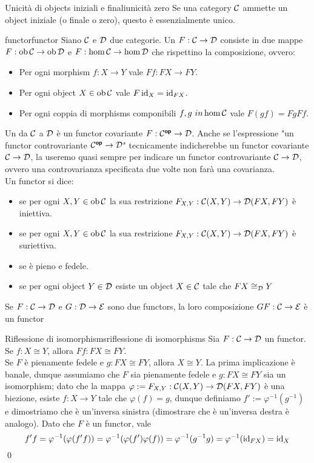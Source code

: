 \documentclass{article}
\renewcommand\C{\mc{C}}
\newcommand\D{\mc{D}}
\begin{document}
\begin{proposition}{Unicità di objects iniziali e finali}{unicità zero}
    Se una category $\C$ ammette un object iniziale (o finale o zero), questo è essenzialmente unico.
\end{proposition}

\begin{definition}{functor}{functor}
    Siano $\C$ e $\D$ due categorie. Un  $F: \C\to\D$ consiste in due mappe $F:\ob\C\to\ob\D$ e $F:\hom\C\to\hom\D$ che rispettino la composizione, ovvero:\begin{itemize}
        \item Per ogni morphism $f :X\to Y$ vale $Ff: FX \to FY$.
        \item Per ogni object $X \in \ob\C$ vale $F\operatorname{id}_X = \operatorname{id}_{FX}$.
        \item Per ogni coppia di morphisms componibili $f,g\ in \hom\C$ vale $F(gf) = FgFf$.
    \end{itemize}
    Un  da $\C$ a $\D$ è un functor covariante $F: \C^\op\to\D$. Anche se l'espressione "un functor controvariante $\C^\op\to\D$" tecnicamente indicherebbe un functor covariante $\C\to\D$, la useremo quasi sempre per indicare un functor controvariante $\C\to\D$, ovvero una controvarianza specificata due volte non farà una covarianza.\\
    Un functor si dice:\begin{itemize}
        \item {} se per ogni $X,Y \in \ob\C$ la sua restrizione $F_{X,Y}:\C(X,Y)\to \D(FX,FY)$ è iniettiva.
        \item {} se per ogni $X,Y \in \ob\C$ la sua restrizione $F_{X,Y}:\C(X,Y)\to \D(FX,FY)$ è suriettiva.
        \item {} se è pieno e fedele.
        \item {} se per ogni object $Y \in \D$ esiste un object $X \in \C$ tale che $FX\cong_\D Y$
    \end{itemize}
    Se $F:\C\to\D$ e $G:\D\to\mc{E}$ sono due functors, la loro composizione $GF : \C\to\mc{E}$ è un functor
\end{definition}

\begin{proposition}{Riflessione di isomorphisms}{riflessione di isomorphisms}
    Sia $F:\C\to\D$ un functor. Se $f:X\cong Y$, allora $Ff:FX\cong FY$.\\
    Se $F$ è pienamente fedele e $g:FX\cong FY$, allora $X\cong Y$.
    \proof 
    La prima implicazione è banale, dunque assumiamo che $F$ sia pienamente fedele e $g:FX\cong FY$ sia un isomorphism; dato che la mappa $\varphi := F_{X,Y} : \C(X,Y) \to \D(FX,FY)$ è una biezione, esiste $f: X\to Y$ tale che $\varphi(f) = g$, dunque definiamo $f' := \varphi^{-1}(g^{-1})$ e dimostriamo che è un'inversa sinistra (dimostrare che è un'inversa destra è analogo). Dato che $F$ è un functor, vale
    \[f'f = \varphi^{-1}(\varphi(f'f) )=\varphi^{-1}(\varphi(f')\varphi(f)) = \varphi^{-1}(g^{-1}g) = \varphi^{-1}(\operatorname{id}_{FX}) = \operatorname{id}_X\]
    \qed
\end{proposition}
\end{document}
